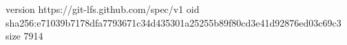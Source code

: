 version https://git-lfs.github.com/spec/v1
oid sha256:e71039b7178dfa7793671c34d435301a25255b89f80cd3e41d92876ed03c69c3
size 7914
